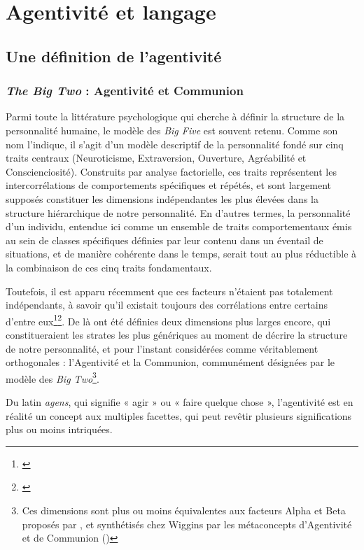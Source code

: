 \part{Agentivité et langage}

\chapter{Une définition de l’agentivité}

\section{\textit{The Big Two} : Agentivité et Communion}

Parmi toute la littérature psychologique qui cherche à définir la structure de la personnalité humaine, le modèle des \textit{Big Five} est souvent retenu. Comme son nom l'indique, il s'agit d'un modèle descriptif de la personnalité fondé sur cinq traits centraux (Neuroticisme, Extraversion, Ouverture, Agréabilité et Conscienciosité). Construits par analyse factorielle, ces traits représentent les intercorrélations de comportements spécifiques et répétés, et sont largement supposés constituer les dimensions indépendantes les plus élevées dans la structure hiérarchique de notre personnalité. En d'autres termes, la personnalité d’un individu, entendue ici comme un ensemble de traits comportementaux émis au sein de classes spécifiques définies par leur contenu dans un éventail de situations, et de manière cohérente dans le temps, serait tout au plus réductible à la combinaison de ces cinq traits fondamentaux.

Toutefois, il est apparu récemment que ces facteurs n'étaient pas totalement indépendants, à savoir qu'il existait toujours des corrélations entre certains d’entre eux\footnote{\cite{block_contrarian_1995}}\footnote{\cite{egan_neo-ffi_2000}}. De là ont été définies deux dimensions plus larges encore, qui constitueraient les strates les plus génériques au moment de décrire la structure de notre personnalité, et pour l'instant considérées comme véritablement orthogonales : l’Agentivité et la Communion, communément désignées par le modèle des \textit{Big Two}\footnote{Ces dimensions sont plus ou moins équivalentes aux facteurs Alpha et Beta proposés par {\cite{digman_higher-order_1997}}, et synthétisés chez Wiggins par les métaconcepts d'Agentivité et de Communion (\cite{wiggins_agency_1991})}.

Du latin \textit{agens}, qui signifie « agir » ou « faire quelque chose », l’agentivité est en réalité un concept aux multiples facettes, qui peut revêtir plusieurs significations plus ou moins intriquées. 

